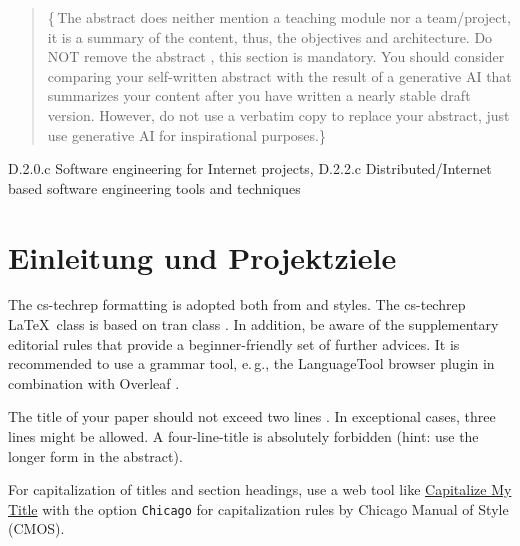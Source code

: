 \documentclass[conference,a4paper]{cs-techrep}
\begin{document}
\selectlanguage{\cstechrepLang}

\maketitle

\begin{abstract}
\lipsum[1][3-10]
\{\,\faWarning{}The abstract does neither mention a teaching module nor a team/project,
it is a summary of the content, thus, the objectives and architecture.
Do NOT remove the abstract \faWarning{}, this section is mandatory.
You should consider comparing your self-written abstract with the result of a generative AI that summarizes your content after you have written a nearly stable draft version. However, do not use a verbatim copy to replace your abstract, just use generative AI for inspirational purposes.\}
\end{abstract}

\begin{IEEEkeywords}
D.2.0.c Software engineering for Internet projects, D.2.2.c Distributed/Internet based software
engineering tools and techniques
\end{IEEEkeywords}

\section{Einleitung und Projektziele}

The cs-techrep formatting is adopted both from  \cite{ieee2018formattingrules} and  \cite{iaria2014formattingrules} styles.
The cs-techrep \LaTeX\ class is based on tran class \cite{ieee2015howto}.
In addition, be aware of the supplementary  editorial rules \cite{iaria2009editorialrules} \faWarning{} that provide a beginner-friendly set of further advices.
It is recommended to use a grammar tool, e.\,g., the LanguageTool \cite{languagetool} browser plugin in combination with Overleaf \cite{overleaf}.

The title of your paper should not exceed two lines \faWarning{}. In exceptional cases, three lines might be allowed. A four-line-title is absolutely forbidden (hint: use the longer form in the abstract).

For capitalization of titles and section headings, use a web tool like \href{https://capitalizemytitle.com/style/Chicago/}{Capitalize My Title} \faWarning{} with the option \texttt{Chicago} for capitalization rules by Chicago Manual of Style (CMOS).
\end{document}

